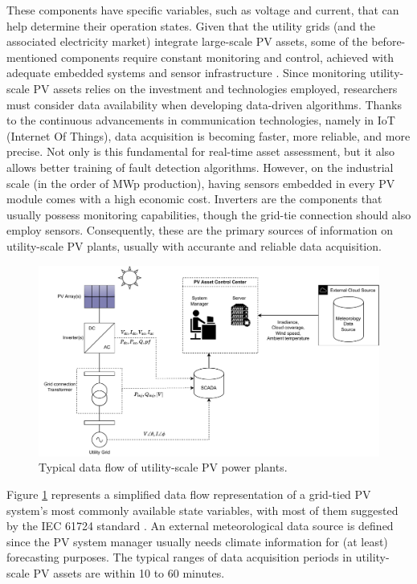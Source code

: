 These components have specific variables, such as voltage and current, that can help determine their operation states. Given that the utility grids (and the associated electricity market) integrate large-scale PV assets, some of the before-mentioned components require constant monitoring and control, achieved with adequate embedded systems and sensor infrastructure \cite{AIPV}. Since monitoring utility-scale PV assets relies on the investment and technologies employed, researchers must consider data availability when developing data-driven algorithms. Thanks to the continuous advancements in communication technologies, namely in IoT (Internet Of Things), data acquisition is becoming faster, more reliable, and more precise. Not only is this fundamental for real-time asset assessment, but it also allows better training of fault detection algorithms. However, on the industrial scale (in the order of MWp production), having sensors embedded in every PV module comes with a high economic cost. Inverters are the components that usually possess monitoring capabilities, though the grid-tie connection should also employ sensors. Consequently, these are the primary sources of information on utility-scale PV plants, usually with accurante and reliable data acquisition.

\begin{figure}[h!]
    \centering
    \includegraphics[width=\linewidth]{figures/chapter2/pvdata.drawio.pdf}
    \caption{Typical data flow of utility-scale PV power plants.}
    \label{fig:pvdataflow}
\end{figure}

Figure \ref{fig:pvdataflow} represents a simplified data flow representation of a grid-tied PV system's most commonly available state variables, with most of them suggested by the IEC 61724 standard \cite{iec61724}. An external meteorological data source is defined since the PV system manager usually needs climate information for (at least) forecasting purposes. The typical ranges of data acquisition periods in utility-scale PV assets are within 10 to 60 minutes.


